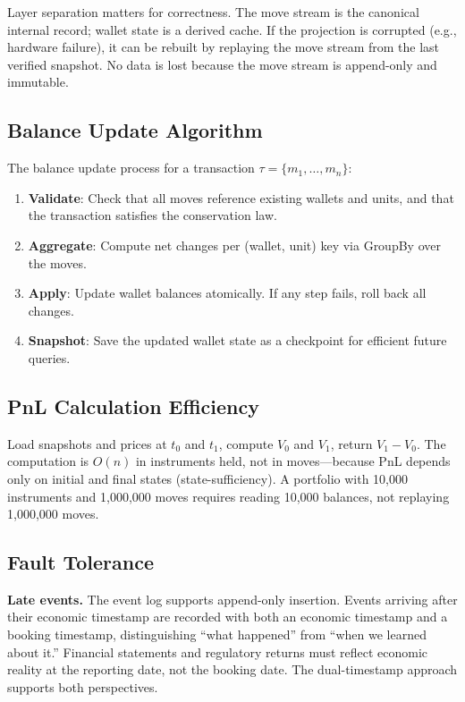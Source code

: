 \documentclass[11pt,a4paper]{article}
\begin{document}
Layer separation matters for correctness. The move stream is the canonical internal record; wallet state is a derived cache. If the projection is corrupted (e.g., hardware failure), it can be rebuilt by replaying the move stream from the last verified snapshot. No data is lost because the move stream is append-only and immutable.

\subsection{Balance Update Algorithm}

The balance update process for a transaction $\tau = \{m_1, \ldots, m_n\}$:

\begin{enumerate}[nosep]
\item \textbf{Validate}: Check that all moves reference existing wallets and units, and that the transaction satisfies the conservation law.
\item \textbf{Aggregate}: Compute net changes per (wallet, unit) key via GroupBy over the moves.
\item \textbf{Apply}: Update wallet balances atomically. If any step fails, roll back all changes.
\item \textbf{Snapshot}: Save the updated wallet state as a checkpoint for efficient future queries.
\end{enumerate}

\subsection{PnL Calculation Efficiency}

Load snapshots and prices at $t_0$ and $t_1$, compute $V_0$ and $V_1$, return $V_1 - V_0$. The computation is $O(n)$ in instruments held, not in moves---because PnL depends only on initial and final states (state-sufficiency). A portfolio with 10{,}000 instruments and 1{,}000{,}000 moves requires reading 10{,}000 balances, not replaying 1{,}000{,}000 moves.

\subsection{Fault Tolerance}

\noindent\textbf{Late events.} The event log supports append-only insertion. Events arriving after their economic timestamp are recorded with both an economic timestamp and a booking timestamp, distinguishing ``what happened'' from ``when we learned about it.'' Financial statements and regulatory returns must reflect economic reality at the reporting date, not the booking date. The dual-timestamp approach supports both perspectives.
\end{document}
